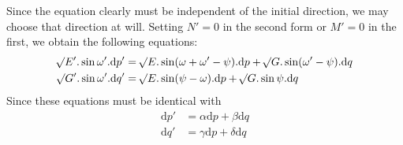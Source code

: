 Since the equation clearly must be independent of the initial direction, we may choose that direction at will. Setting \(N'=0\) in the second form or \(M'=0\) in the first, we obtain the following equations:
\[
\begin{aligned}
\mathord{{}^{}\!\surd}E'\mathord{.}\sin\omega'\mathord{.}\mathrm{d}p'&=\mathord{{}^{}\!\surd}E\mathord{.}\sin(\omega+\omega'-\psi)\mathord{.}\mathrm{d}p+\mathord{{}^{}\!\surd}G\mathord{.}\sin(\omega'-\psi)\mathord{.}\mathrm{d}q\\
\mathord{{}^{}\!\surd}G'\mathord{.}\sin\omega'\mathord{.}\mathrm{d}q'&=\mathord{{}^{}\!\surd}E\mathord{.}\sin(\psi-\omega)\mathord{.}\mathrm{d}p+\mathord{{}^{}\!\surd}G\mathord{.}\sin\psi\mathord{.}\mathrm{d}q
\end{aligned}
\]
Since these equations must be identical with
\[
\begin{aligned}
\mathrm{d}p'&=\alpha\mathrm{d}p+\beta\mathrm{d}q\\
\mathrm{d}q'&=\gamma\mathrm{d}p+\delta\mathrm{d}q
\end{aligned}
\]
